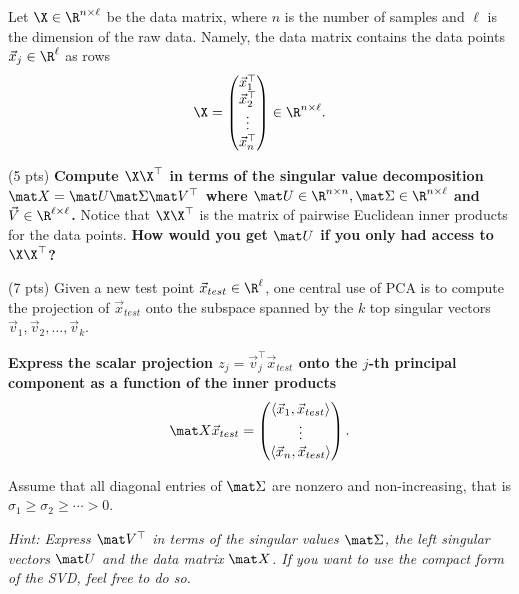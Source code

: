 \documentclass[preview]{standalone}
\begin{document}
Let $\X \in \R^{n \times \ell}$ be the data matrix, where $n$ is the number of
samples and $\ell$ is the dimension of the raw data. Namely, the data matrix
contains the data points $\vec x_j \in \R^\ell$ as rows
\begin{align}
\X = \begin{pmatrix}
\vec x_1^\top\\
\vec x_2^\top\\
\vdots\\
\vec x_n^\top
\end{pmatrix}\in \R^{n\times \ell}.
\end{align}

\begin{Parts}

\Part (5 pts) \textbf{Compute $\X \X^\top$ in terms of the singular
value decomposition $\mat X = \mat U\mat \Sigma \mat V^\top$ where $\mat U \in \R^{n\times n},
\mat \Sigma \in \R^{n\times \ell}$ and $\vec V \in \R^{\ell \times \ell}$.} Notice that
$\X \X^\top$ is the matrix of pairwise Euclidean inner products for
the data points. \textbf{How would you get $\mat U$ if you
only had access to $\X \X^\top$?}


\newpage

\Part (7 pts) Given a new test point $\vec x_{test} \in \R^{\ell}$, one central use of PCA is to
compute the projection of $\vec x_{test}$ onto the subspace spanned by the $k$
top singular vectors $\vec v_1, \vec v_2, \ldots, \vec v_k$.

\textbf{Express the scalar projection
$z_j = \vec v_j^\top \vec x_{test}$ onto the $j$-th principal
component  as a function of the inner products}
\begin{align}
\mat X \vec x_{test} =
\begin{pmatrix}
  \langle \vec x_1, \vec x_{test}\rangle\\
  \vdots\\
  \langle \vec x_n, \vec x_{test}\rangle
\end{pmatrix}.
\end{align}

Assume that all diagonal entries of $\mat \Sigma$ are nonzero and non-increasing,
that is $\sigma_1 \geq \sigma_{2} \geq \cdots > 0$.

{\em Hint: Express $\mat V^\top$ in terms of the singular values $\mat
  \Sigma$, the left singular vectors $\mat U$ and the data matrix $\mat
  X$. If you want to use the compact form of the SVD, feel free to do so.}




\end{Parts}
\end{document}

